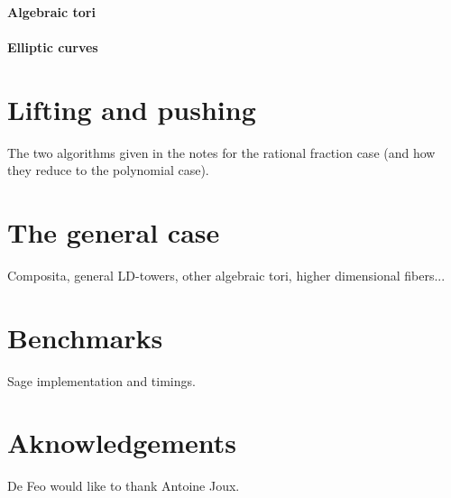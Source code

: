 \documentclass{sig-alternate}
\begin{document}
\paragraph{Algebraic tori}

\paragraph{Elliptic curves}




\section{Lifting and pushing}
\label{sec:lift-push}

The two algorithms given in the notes for the rational fraction case
(and how they reduce to the polynomial case).


\section{The general case}
\label{sec:general}

Composita, general LD-towers, other algebraic tori, higher dimensional
fibers...


\section{Benchmarks}
\label{sec:bench}

Sage implementation and timings.


\section{Aknowledgements}
De Feo would like to thank Antoine Joux.



\end{document}

